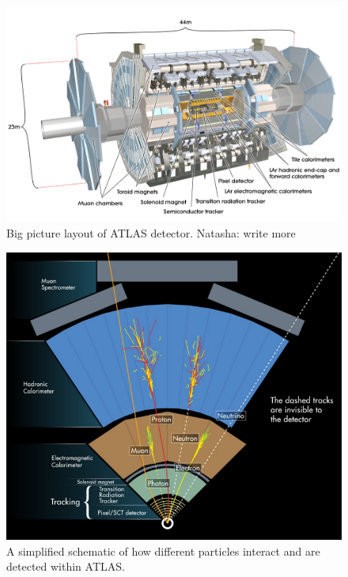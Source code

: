 \begin{figure}[h!]
  \centering
  \includegraphics[width=\hsize]{figures/Detector/atlas.jpg}
  \caption{Big picture layout of ATLAS detector. Natasha: write more} 
  \label{fig:atlas_detectors}
\end{figure}
\FloatBarrier

\begin{figure}[h!]
  \centering
  \includegraphics[width=\hsize]{figures/Detector/particle_detection_atlas.png}
  \caption{A simplified schematic of how different particles interact and are detected within ATLAS.} 
  \label{fig:particle_detection}
\end{figure}
\FloatBarrier

